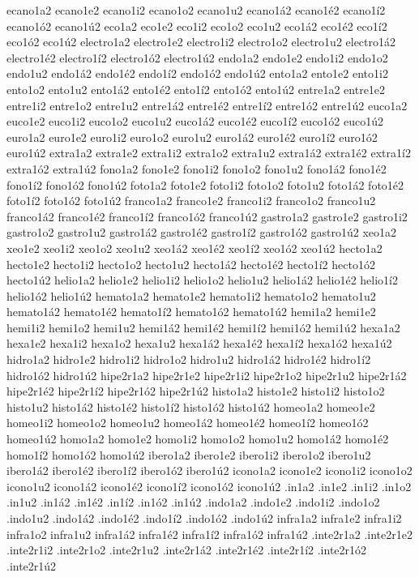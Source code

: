 {ecano1a2 ecano1e2 ecano1i2 ecano1o2 ecano1u2 ecano1á2 ecano1é2 ecano1í2 ecano1ó2 ecano1ú2 
eco1a2 eco1e2 eco1i2 eco1o2 eco1u2 eco1á2 eco1é2 eco1í2 eco1ó2 eco1ú2 
electro1a2 electro1e2 electro1i2 electro1o2 electro1u2 electro1á2 electro1é2 electro1í2 electro1ó2 electro1ú2 
endo1a2 endo1e2 endo1i2 endo1o2 endo1u2 endo1á2 endo1é2 endo1í2 endo1ó2 endo1ú2 
ento1a2 ento1e2 ento1i2 ento1o2 ento1u2 ento1á2 ento1é2 ento1í2 ento1ó2 ento1ú2 
entre1a2 entre1e2 entre1i2 entre1o2 entre1u2 entre1á2 entre1é2 entre1í2 entre1ó2 entre1ú2 
euco1a2 euco1e2 euco1i2 euco1o2 euco1u2 euco1á2 euco1é2 euco1í2 euco1ó2 euco1ú2 
euro1a2 euro1e2 euro1i2 euro1o2 euro1u2 euro1á2 euro1é2 euro1í2 euro1ó2 euro1ú2 
extra1a2 extra1e2 extra1i2 extra1o2 extra1u2 extra1á2 extra1é2 extra1í2 extra1ó2 extra1ú2 
fono1a2 fono1e2 fono1i2 fono1o2 fono1u2 fono1á2 fono1é2 fono1í2 fono1ó2 fono1ú2 
foto1a2 foto1e2 foto1i2 foto1o2 foto1u2 foto1á2 foto1é2 foto1í2 foto1ó2 foto1ú2 
franco1a2 franco1e2 franco1i2 franco1o2 franco1u2 franco1á2 franco1é2 franco1í2 franco1ó2 franco1ú2 
gastro1a2 gastro1e2 gastro1i2 gastro1o2 gastro1u2 gastro1á2 gastro1é2 gastro1í2 gastro1ó2 gastro1ú2 
xeo1a2 xeo1e2 xeo1i2 xeo1o2 xeo1u2 xeo1á2 xeo1é2 xeo1í2 xeo1ó2 xeo1ú2 
hecto1a2 hecto1e2 hecto1i2 hecto1o2 hecto1u2 hecto1á2 hecto1é2 hecto1í2 hecto1ó2 hecto1ú2 
helio1a2 helio1e2 helio1i2 helio1o2 helio1u2 helio1á2 helio1é2 helio1í2 helio1ó2 helio1ú2 
hemato1a2 hemato1e2 hemato1i2 hemato1o2 hemato1u2 hemato1á2 hemato1é2 hemato1í2 hemato1ó2 hemato1ú2 
hemi1a2 hemi1e2 hemi1i2 hemi1o2 hemi1u2 hemi1á2 hemi1é2 hemi1í2 hemi1ó2 hemi1ú2 
hexa1a2 hexa1e2 hexa1i2 hexa1o2 hexa1u2 hexa1á2 hexa1é2 hexa1í2 hexa1ó2 hexa1ú2 
hidro1a2 hidro1e2 hidro1i2 hidro1o2 hidro1u2 hidro1á2 hidro1é2 hidro1í2 hidro1ó2 hidro1ú2 
hipe2r1a2 hipe2r1e2 hipe2r1i2 hipe2r1o2 hipe2r1u2 hipe2r1á2 hipe2r1é2 hipe2r1í2 hipe2r1ó2 hipe2r1ú2 
histo1a2 histo1e2 histo1i2 histo1o2 histo1u2 histo1á2 histo1é2 histo1í2 histo1ó2 histo1ú2 
homeo1a2 homeo1e2 homeo1i2 homeo1o2 homeo1u2 homeo1á2 homeo1é2 homeo1í2 homeo1ó2 homeo1ú2 
homo1a2 homo1e2 homo1i2 homo1o2 homo1u2 homo1á2 homo1é2 homo1í2 homo1ó2 homo1ú2 
ibero1a2 ibero1e2 ibero1i2 ibero1o2 ibero1u2 ibero1á2 ibero1é2 ibero1í2 ibero1ó2 ibero1ú2 
icono1a2 icono1e2 icono1i2 icono1o2 icono1u2 icono1á2 icono1é2 icono1í2 icono1ó2 icono1ú2 
.in1a2 .in1e2 .in1i2 .in1o2 .in1u2 .in1á2 .in1é2 .in1í2 .in1ó2 .in1ú2 
.indo1a2 .indo1e2 .indo1i2 .indo1o2 .indo1u2 .indo1á2 .indo1é2 .indo1í2 .indo1ó2 .indo1ú2 
infra1a2 infra1e2 infra1i2 infra1o2 infra1u2 infra1á2 infra1é2 infra1í2 infra1ó2 infra1ú2 
.inte2r1a2 .inte2r1e2 .inte2r1i2 .inte2r1o2 .inte2r1u2 .inte2r1á2 .inte2r1é2 .inte2r1í2 .inte2r1ó2 .inte2r1ú2 
}
